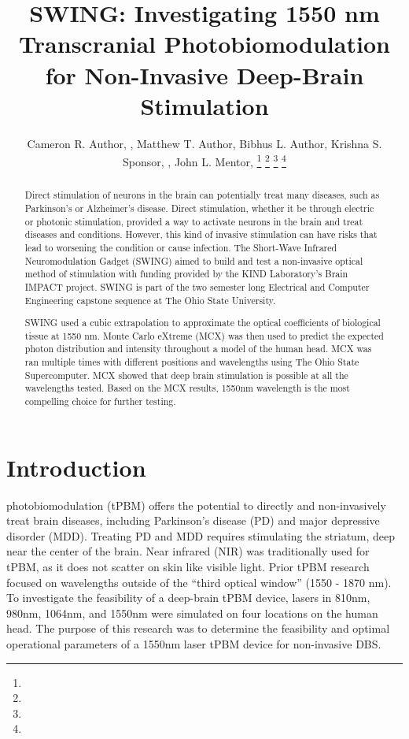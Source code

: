 \documentclass[journal,twoside,web]{ieeecolor}
\begin{document}
\title{SWING: Investigating 1550 nm Transcranial Photobiomodulation for Non-Invasive Deep-Brain Stimulation}
\author{Cameron R. Author, , Matthew T. Author, Bibhus L. Author, 
        Krishna S. Sponsor, , John L. Mentor, 
\thanks{ }
\thanks{ }
\thanks{ }
\thanks{ }}

\maketitle

\begin{abstract}
Direct stimulation of neurons in the brain can potentially treat many diseases, such as Parkinson's  
or Alzheimer's disease. Direct stimulation, whether it be through electric or photonic stimulation,  
provided a way to activate neurons in the brain and treat diseases and conditions. However, this kind  
of invasive stimulation can have risks that lead to worsening the condition or cause infection.  
The Short-Wave Infrared Neuromodulation Gadget (SWING) aimed to build and test a non-invasive optical method  
of stimulation with funding provided by the KIND Laboratory's Brain IMPACT project. SWING is part of the  
two semester long Electrical and Computer Engineering capstone sequence at The Ohio State University. 

SWING used a cubic extrapolation to approximate the optical coefficients of biological tissue at 1550 nm. 
Monte Carlo eXtreme (MCX) was then used to predict the expected photon distribution and intensity throughout a model 
of the human head. MCX was ran multiple times with different positions and wavelengths using The Ohio State Supercomputer. 
MCX showed that deep brain stimulation is possible at all the wavelengths tested. Based on the MCX results, 1550nm wavelength 
is the most compelling choice for further testing.
\end{abstract}

\begin{IEEEkeywords}

\end{IEEEkeywords}

\section{Introduction}
\label{sec:introduction}
 photobiomodulation (tPBM) offers the potential to directly and non-invasively treat brain diseases, 
including Parkinson's disease (PD) and major depressive disorder (MDD). Treating PD and MDD requires stimulating the striatum, deep 
near the center of the brain. Near infrared (NIR) was traditionally used for tPBM, as it does not scatter on skin like visible light. 
Prior tPBM research focused on wavelengths outside of the “third optical window” (1550 - 1870 nm). To investigate the feasibility of a deep-brain 
tPBM device, lasers in 810nm, 980nm, 1064nm, and 1550nm were simulated on four locations on the human head. The purpose of this research was to 
determine the feasibility and optimal operational parameters of a 1550nm laser tPBM device for non-invasive DBS. 
\end{document}

